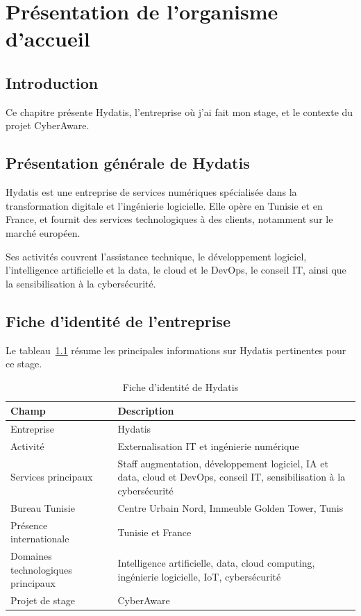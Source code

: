 \documentclass[12pt,a4paper]{report}
\begin{document}
\chapter{Présentation de l'organisme d'accueil}

\section{Introduction}

Ce chapitre présente Hydatis, l'entreprise où j'ai fait mon stage, et le contexte du projet CyberAware.

\section{Présentation générale de Hydatis}

Hydatis est une entreprise de services numériques spécialisée dans la transformation digitale et l'ingénierie logicielle. Elle opère en Tunisie et en France, et fournit des services technologiques à des clients, notamment sur le marché européen.

Ses activités couvrent l'assistance technique, le développement logiciel, l'intelligence artificielle et la data, le cloud et le DevOps, le conseil IT, ainsi que la sensibilisation à la cybersécurité.

\section{Fiche d'identité de l'entreprise}

Le tableau~\ref{tab:hydatis-fact-sheet} résume les principales informations sur Hydatis pertinentes pour ce stage.

\begin{table}[H]
\centering
\begin{tabular}{@{}>{\raggedright\arraybackslash}p{4cm}>{\raggedright\arraybackslash}p{9cm}@{}}
\toprule
\textbf{Champ} & \textbf{Description} \\
\midrule
Entreprise & Hydatis \\
Activité & Externalisation IT et ingénierie numérique \\
Services principaux & Staff augmentation, développement logiciel, IA et data, cloud et DevOps, conseil IT, sensibilisation à la cybersécurité \\
Bureau Tunisie & Centre Urbain Nord, Immeuble Golden Tower, Tunis \\
Présence internationale & Tunisie et France \\
Domaines technologiques principaux & Intelligence artificielle, data, cloud computing, ingénierie logicielle, IoT, cybersécurité \\
Projet de stage & CyberAware \\
\bottomrule
\end{tabular}
\caption{Fiche d'identité de Hydatis}
\label{tab:hydatis-fact-sheet}
\end{table}
\end{document}
